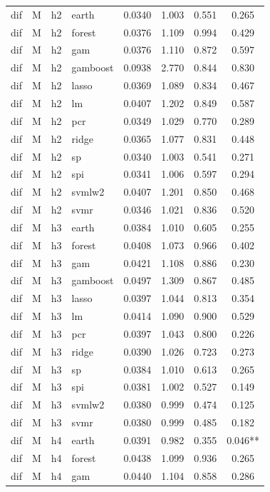 \begin{ThreePartTable}
\begin{longtable}[t]{llclcccc}
\addlinespace
dif & M & h2 & earth & 0.0340 & 1.003 & 0.551 & 0.265\\
dif & M & h2 & forest & 0.0376 & 1.109 & 0.994 & 0.429\\
dif & M & h2 & gam & 0.0376 & 1.110 & 0.872 & 0.597\\
dif & M & h2 & gamboost & 0.0938 & 2.770 & 0.844 & 0.830\\
dif & M & h2 & lasso & 0.0369 & 1.089 & 0.834 & 0.467\\
dif & M & h2 & lm & 0.0407 & 1.202 & 0.849 & 0.587\\
dif & M & h2 & pcr & 0.0349 & 1.029 & 0.770 & 0.289\\
dif & M & h2 & ridge & 0.0365 & 1.077 & 0.831 & 0.448\\
dif & M & h2 & sp & 0.0340 & 1.003 & 0.541 & 0.271\\
dif & M & h2 & spi & 0.0341 & 1.006 & 0.597 & 0.294\\
dif & M & h2 & svmlw2 & 0.0407 & 1.201 & 0.850 & 0.468\\
dif & M & h2 & svmr & 0.0346 & 1.021 & 0.836 & 0.520\\
\addlinespace
dif & M & h3 & earth & 0.0384 & 1.010 & 0.605 & 0.255\\
dif & M & h3 & forest & 0.0408 & 1.073 & 0.966 & 0.402\\
dif & M & h3 & gam & 0.0421 & 1.108 & 0.886 & 0.230\\
dif & M & h3 & gamboost & 0.0497 & 1.309 & 0.867 & 0.485\\
dif & M & h3 & lasso & 0.0397 & 1.044 & 0.813 & 0.354\\
dif & M & h3 & lm & 0.0414 & 1.090 & 0.900 & 0.529\\
dif & M & h3 & pcr & 0.0397 & 1.043 & 0.800 & 0.226\\
dif & M & h3 & ridge & 0.0390 & 1.026 & 0.723 & 0.273\\
dif & M & h3 & sp & 0.0384 & 1.010 & 0.613 & 0.265\\
dif & M & h3 & spi & 0.0381 & 1.002 & 0.527 & 0.149\\
dif & M & h3 & svmlw2 & 0.0380 & 0.999 & 0.474 & 0.125\\
dif & M & h3 & svmr & 0.0380 & 0.999 & 0.485 & 0.182\\
\addlinespace
dif & M & h4 & earth & 0.0391 & 0.982 & 0.355 & 0.046**\\
dif & M & h4 & forest & 0.0438 & 1.099 & 0.936 & 0.265\\
dif & M & h4 & gam & 0.0440 & 1.104 & 0.858 & 0.286\\

\end{longtable}
\end{ThreePartTable}

